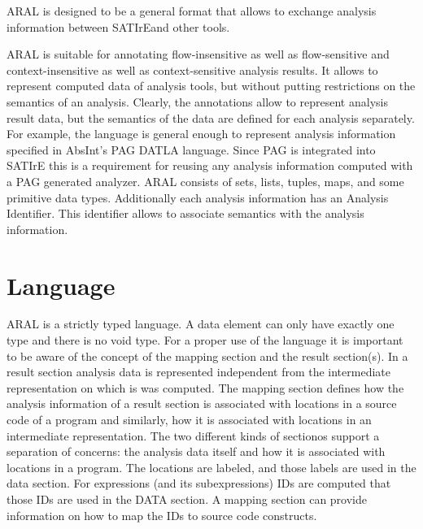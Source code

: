\documentclass[a4paper,12pt]{report}
\newcommand{\satire}[0]{SATIrE}
\newcommand{\outcomment}[1]{}
\begin{document}
ARAL is designed to be a
general format that allows to exchange analysis information between
\satire and other tools. 


ARAL is suitable for annotating flow-insensitive as well as
flow-sensitive and context-insensitive as well as context-sensitive
analysis results. It allows to represent computed data of analysis
tools, but without putting restrictions on the semantics of an
analysis. Clearly, the annotations allow to represent analysis result
data, but the semantics of the data are defined for each analysis
separately. For example, the language is general enough to represent
analysis information specified in AbsInt's PAG DATLA language. Since
PAG is integrated into \satire{} this is a requirement for reusing any
analysis information computed with a PAG generated analyzer. ARAL
consists of sets, lists, tuples, maps, and some primitive data
types. Additionally each analysis information has an Analysis
Identifier. This identifier allows to associate semantics with the
analysis information.



\section{Language}


ARAL is a strictly typed language. A data element can only have
exactly one type and there is no void type. For a proper use of the
language it is important to be aware of the concept of the mapping
section and the result section(s). In a result section analysis data
is represented independent from the intermediate representation on
which is was computed. The mapping section defines how the analysis
information of a result section is associated with locations in a
source code of a program and similarly, how it is associated with
locations in an intermediate representation. The two different kinds
of sectionos support a separation of concerns: the analysis data
itself and how it is associated with locations in a program. The
locations are labeled, and those labels are used in the data
section. For expressions (and its subexpressions) IDs are computed
that those IDs are used in the DATA section. A mapping section can
provide information on how to map the IDs to source code constructs.
\end{document}
